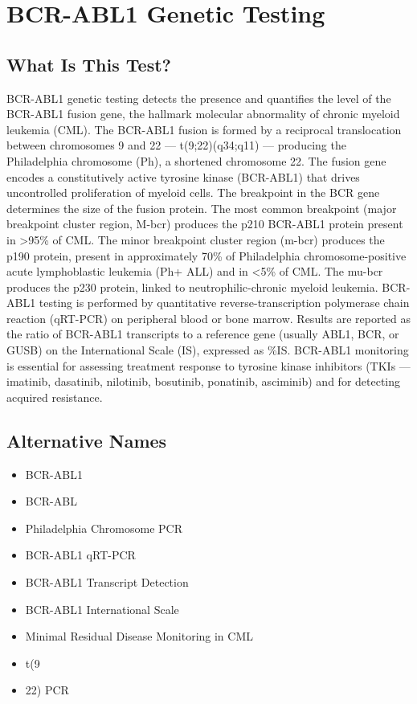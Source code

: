 \chapter{BCR-ABL1 Genetic Testing}

\section*{What Is This Test?}
BCR-ABL1 genetic testing detects the presence and quantifies the level of the BCR-ABL1 fusion gene, the hallmark molecular abnormality of chronic myeloid leukemia (CML). The BCR-ABL1 fusion is formed by a reciprocal translocation between chromosomes 9 and 22 --- t(9;22)(q34;q11) --- producing the Philadelphia chromosome (Ph), a shortened chromosome 22. The fusion gene encodes a constitutively active tyrosine kinase (BCR-ABL1) that drives uncontrolled proliferation of myeloid cells. The breakpoint in the BCR gene determines the size of the fusion protein. The most common breakpoint (major breakpoint cluster region, M-bcr) produces the p210 BCR-ABL1 protein present in >95\% of CML. The minor breakpoint cluster region (m-bcr) produces the p190 protein, present in approximately 70\% of Philadelphia chromosome-positive acute lymphoblastic leukemia (Ph+ ALL) and in <5\% of CML. The mu-bcr produces the p230 protein, linked to neutrophilic-chronic myeloid leukemia. BCR-ABL1 testing is performed by quantitative reverse-transcription polymerase chain reaction (qRT-PCR) on peripheral blood or bone marrow. Results are reported as the ratio of BCR-ABL1 transcripts to a reference gene (usually ABL1, BCR, or GUSB) on the International Scale (IS), expressed as \%IS. BCR-ABL1 monitoring is essential for assessing treatment response to tyrosine kinase inhibitors (TKIs --- imatinib, dasatinib, nilotinib, bosutinib, ponatinib, asciminib) and for detecting acquired resistance.

\section*{Alternative Names}
\begin{itemize}
  \item BCR-ABL1
  \item BCR-ABL
  \item Philadelphia Chromosome PCR
  \item BCR-ABL1 qRT-PCR
  \item BCR-ABL1 Transcript Detection
  \item BCR-ABL1 International Scale
  \item Minimal Residual Disease Monitoring in CML
  \item t(9
  \item 22) PCR
\end{itemize}
